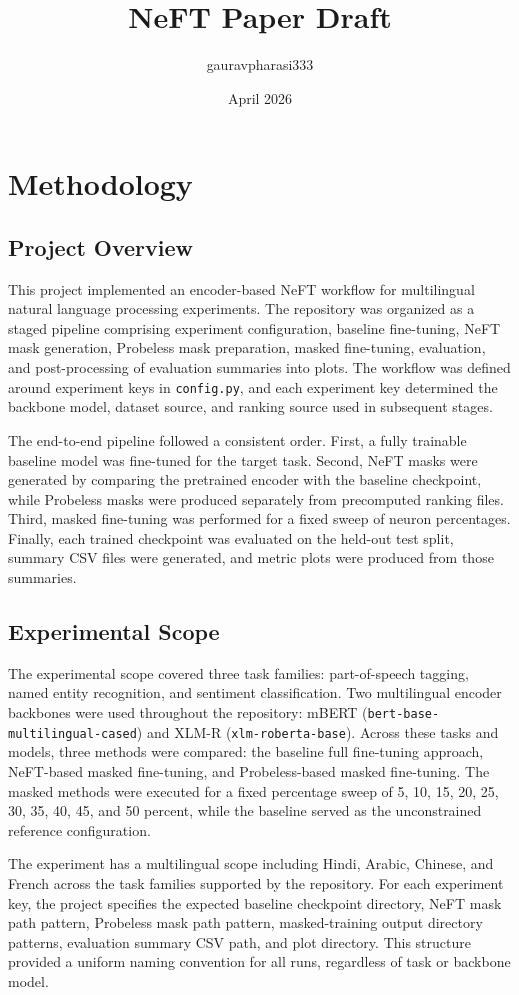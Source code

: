 \documentclass[12pt]{article}
\title{NeFT Paper Draft}
\author{gauravpharasi333 }
\date{April 2026}
\begin{document}
\section{Methodology}

\subsection{Project Overview}

This project implemented an encoder-based NeFT workflow for multilingual natural language processing experiments. The repository was organized as a staged pipeline comprising experiment configuration, baseline fine-tuning, NeFT mask generation, Probeless mask preparation, masked fine-tuning, evaluation, and post-processing of evaluation summaries into plots. The workflow was defined around experiment keys in \texttt{config.py}, and each experiment key determined the backbone model, dataset source, and ranking source used in subsequent stages.

The end-to-end pipeline followed a consistent order. First, a fully trainable baseline model was fine-tuned for the target task. Second, NeFT masks were generated by comparing the pretrained encoder with the baseline checkpoint, while Probeless masks were produced separately from precomputed ranking files. Third, masked fine-tuning was performed for a fixed sweep of neuron percentages. Finally, each trained checkpoint was evaluated on the held-out test split, summary CSV files were generated, and metric plots were produced from those summaries.

\subsection{Experimental Scope}

The experimental scope covered three task families: part-of-speech tagging, named entity recognition, and sentiment classification. Two multilingual encoder backbones were used throughout the repository: mBERT (\texttt{bert-base-multilingual-cased}) and XLM-R (\texttt{xlm-roberta-base}). Across these tasks and models, three methods were compared: the baseline full fine-tuning approach, NeFT-based masked fine-tuning, and Probeless-based masked fine-tuning. The masked methods were executed for a fixed percentage sweep of 5, 10, 15, 20, 25, 30, 35, 40, 45, and 50 percent, while the baseline served as the unconstrained reference configuration.

The experiment has a multilingual scope including Hindi, Arabic, Chinese, and French across the task families supported by the repository. For each experiment key, the project specifies the expected baseline checkpoint directory, NeFT mask path pattern, Probeless mask path pattern, masked-training output directory patterns, evaluation summary CSV path, and plot directory. This structure provided a uniform naming convention for all runs, regardless of task or backbone model.
\end{document}
